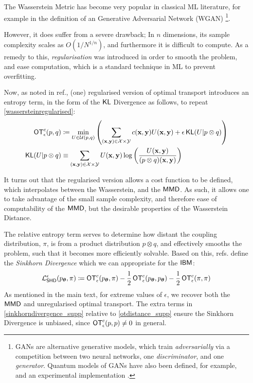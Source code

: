 \noindent The Wasserstein Metric has become very popular in classical ML literature, for example in the definition of an Generative Adversarial Network (WGAN) \footnote{GANs are alternative generative models, which train \textit{adversarially} via a competition between two neural networks, one \textit{discriminator}, and one \textit{generator}. Quantum models of GANs have also been defined, for example,  and an experimental implementation .}. 

However, it does suffer from a severe drawback;  In $n$ dimensions, its sample complexity scales as $O(1/N^{1/n})$, and furthermore it is difficult to compute. As a remedy to this, \textit{regularisation} was introduced in order to smooth the problem, and ease computation, which is a standard technique in ML to prevent overfitting.

Now, as noted in ref., (one) regularised version of optimal transport introduces an entropy term, in the form of the $\operatorname{\textsf{KL}}$ Divergence as follows, to repeat \eqref{wassersteinregularised}:
\begin{align}
\operatorname{\textsf{OT}}^c_\epsilon(p, q) & \coloneqq  \min\limits_{U \in \mathcal{U}(p, q)}\left(\sum\limits_{(\mathbf{x}, \mathbf{y}) \in \mathcal{X}\times\mathcal{Y}} c(\mathbf{x}, \mathbf{y})U(\mathbf{x}, \mathbf{y}) + \epsilon \operatorname{\textsf{KL}}(U|p \otimes q)\right) \label{wassersteinregularised_supp}\\
\operatorname{\textsf{KL}}(U|p \otimes q) &\equiv \sum\limits_{(\mathbf{x}, \mathbf{y}) \in \mathcal{X}\times\mathcal{Y}} U(\mathbf{x}, \mathbf{y}) \log\left(\frac{U(\mathbf{x}, \mathbf{y})}{(p\otimes q )(\mathbf{x}, \mathbf{y})}\right)
\end{align}


\noindent It turns out that the regularised version allows a cost function to be defined, which interpolates between the Wasserstein, and the $\operatorname{\textsf{MMD}}$. As such, it allows one to take advantage of the small sample complexity, and therefore ease of computability of the $\operatorname{\textsf{MMD}}$, but the desirable properties of the Wasserstein Distance.

The relative entropy term serves to determine how distant the coupling distribution, $\pi$, is from a product distribution $p\otimes q$,  and effectively smooths the problem, such that it becomes more efficiently solvable. Based on this, refs. define the \textit{Sinkhorn Divergence} which we can appropriate for the $\textsf{IBM}$:
\begin{align}
    \mathcal{L}_{\operatorname{\textsf{SHD}}}^\epsilon(p_{\boldsymbol\theta}, \pi)  \coloneqq \operatorname{\textsf{OT}}^c_\epsilon(p_{\boldsymbol\theta}, \pi) - \frac{1}{2} \operatorname{\textsf{OT}}^c_\epsilon(p_{\boldsymbol\theta}, p_{\boldsymbol\theta}) -\frac{1}{2}\operatorname{\textsf{OT}}^c_\epsilon(\pi, \pi) \label{sinkhorndivergence_supp}
\end{align}
As mentioned in the main text, for extreme values of $\epsilon$, we recover both the $\operatorname{\textsf{MMD}}$ and unregularised optimal transport. The extra terms in \eqref{sinkhorndivergence_supp} relative to \eqref{otdistance_supp} ensure the Sinkhorn Divergence is unbiased, since $\operatorname{\textsf{OT}}^c_\epsilon(p, p) \neq 0$ in general.

